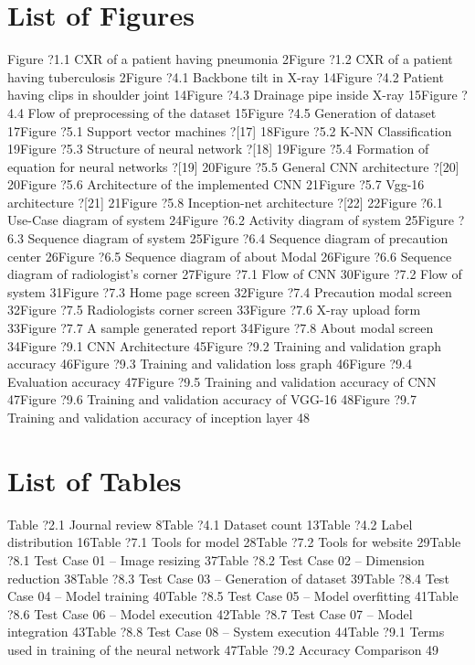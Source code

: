 \documentclass{article} %
\begin{document}
\noindent 
\section{List of Figures}

\noindent Figure ?1.1 CXR of a patient having pneumonia 2Figure ?1.2 CXR of a patient having tuberculosis 2Figure ?4.1 Backbone tilt in X-ray 14Figure ?4.2 Patient having clips in shoulder joint 14Figure ?4.3 Drainage pipe inside X-ray 15Figure ?4.4 Flow of preprocessing of the dataset 15Figure ?4.5 Generation of dataset 17Figure ?5.1 Support vector machines ?[17] 18Figure ?5.2 K-NN Classification 19Figure ?5.3 Structure of neural network ?[18] 19Figure ?5.4 Formation of equation for neural networks ?[19] 20Figure ?5.5 General CNN architecture ?[20] 20Figure ?5.6 Architecture of the implemented CNN 21Figure ?5.7 Vgg-16 architecture ?[21] 21Figure ?5.8 Inception-net architecture ?[22] 22Figure ?6.1 Use-Case diagram of system 24Figure ?6.2 Activity diagram of system 25Figure ?6.3 Sequence diagram of system 25Figure ?6.4 Sequence diagram of precaution center 26Figure ?6.5 Sequence diagram of about Modal 26Figure ?6.6 Sequence diagram of radiologist's corner 27Figure ?7.1 Flow of CNN 30Figure ?7.2 Flow of system 31Figure ?7.3 Home page screen 32Figure ?7.4 Precaution modal screen 32Figure ?7.5 Radiologists corner screen 33Figure ?7.6 X-ray upload form 33Figure ?7.7 A sample generated report 34Figure ?7.8 About modal screen 34Figure ?9.1 CNN Architecture 45Figure ?9.2 Training and validation graph accuracy 46Figure ?9.3 Training and validation loss graph 46Figure ?9.4 Evaluation accuracy 47Figure ?9.5 Training and validation accuracy of CNN 47Figure ?9.6 Training and validation accuracy of VGG-16 48Figure ?9.7 Training and validation accuracy of inception layer 48

\noindent \eject 

\noindent 

\noindent 
\section{List of Tables}

\noindent Table ?2.1 Journal review 8Table ?4.1 Dataset count 13Table ?4.2 Label distribution 16Table ?7.1 Tools for model 28Table ?7.2 Tools for website 29Table ?8.1 Test Case 01 -- Image resizing 37Table ?8.2 Test Case 02 -- Dimension reduction 38Table ?8.3 Test Case 03 -- Generation of dataset 39Table ?8.4 Test Case 04 -- Model training 40Table ?8.5 Test Case 05 -- Model overfitting 41Table ?8.6 Test Case 06 -- Model execution 42Table ?8.7 Test Case 07 -- Model integration 43Table ?8.8 Test Case 08 -- System execution 44Table ?9.1 Terms used in training of the neural network 47Table ?9.2 Accuracy Comparison 49
\end{document}

